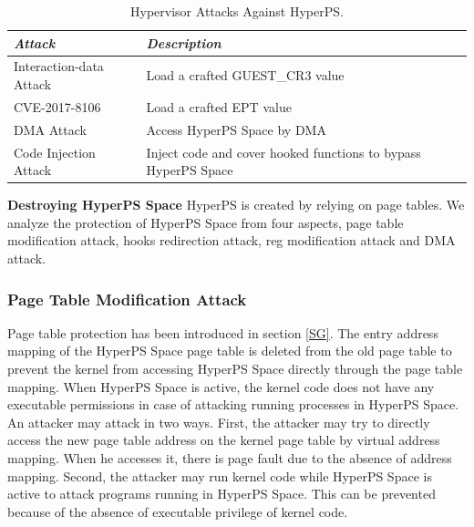 \begin{table}
\centering
\caption{Hypervisor Attacks Against HyperPS.}\label{tab3}
\begin{tabular}{p{2.8cm}|p{5.5cm}}
\hline
{\itshape\bfseries Attack} & {\itshape\bfseries Description} \\
\hline
Interaction-data Attack & Load a crafted GUEST\_CR3 value\\
\hline
CVE-2017-8106 & Load a crafted EPT value \\
\hline
DMA Attack & Access HyperPS Space by DMA \\
\hline
Code Injection Attack & Inject code and cover hooked functions to bypass HyperPS Space \\
\hline
\end{tabular}
\end{table}

\textbf{Destroying HyperPS Space}
HyperPS is created by relying on page tables.
We analyze the protection of HyperPS Space from four aspects, page table modification attack, hooks redirection attack, reg modification attack and DMA attack.


\subsubsection{Page Table Modification Attack}

Page table protection has been introduced in section \ref{SG}. The entry address mapping of the HyperPS Space page table is deleted from the old page table to prevent the kernel from accessing HyperPS Space directly through the page table mapping. When HyperPS Space is active, the kernel code does not have any executable permissions in case of attacking running processes in HyperPS Space. An attacker may attack in two ways.
First, the attacker may try to directly access the new page table address on the kernel page table by virtual address mapping. When he accesses it, there is page fault due to the absence of address mapping.
Second, the attacker may run kernel code while HyperPS Space is active to attack programs running in HyperPS Space. This can be prevented because of the absence of executable privilege of kernel code.




